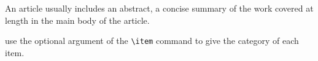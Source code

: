An article usually includes an abstract, a concise summary of the work
covered at length in the main body of the article. 

use the optional argument of the \verb+\item+ command to give the category of each item. 
